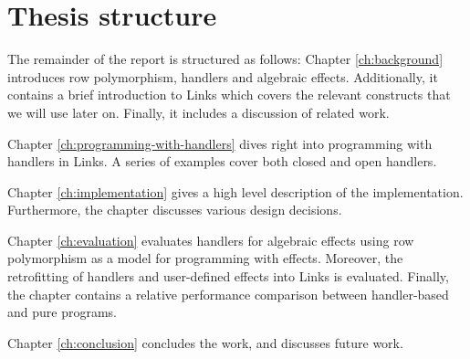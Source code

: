 \section{Thesis structure}
The remainder of the report is structured as follows: Chapter \ref{ch:background} introduces row polymorphism, handlers and algebraic effects. Additionally, it contains a brief introduction to Links which covers the relevant constructs that we will use later on. Finally, it includes a discussion of related work.

Chapter \ref{ch:programming-with-handlers} dives right into programming with handlers in Links. A series of examples cover both closed and open handlers.

Chapter \ref{ch:implementation} gives a high level description of the implementation. Furthermore, the chapter discusses various design decisions.

Chapter \ref{ch:evaluation} evaluates handlers for algebraic effects using row polymorphism as a model for programming with effects. Moreover, the retrofitting of handlers and user-defined effects into Links is evaluated. Finally, the chapter contains a relative performance comparison between handler-based and pure programs.

Chapter \ref{ch:conclusion} concludes the work, and discusses future work.